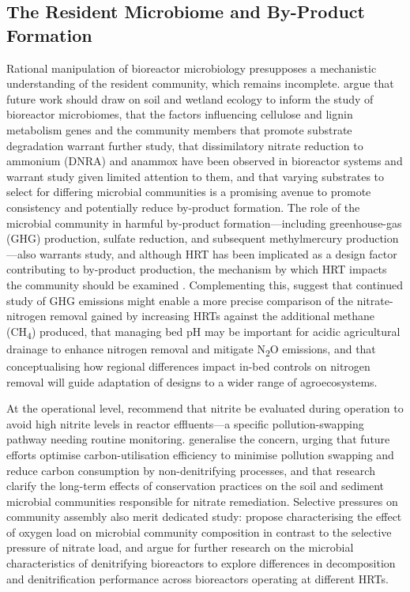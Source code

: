 \documentclass[11pt]{article}
\begin{document}
\subsection{The Resident Microbiome and By-Product Formation}
Rational manipulation of bioreactor microbiology presupposes a mechanistic understanding of the resident community, which remains incomplete. \textcite{Hartfiel2022} argue that future work should draw on soil and wetland ecology to inform the study of bioreactor microbiomes, that the factors influencing cellulose and lignin metabolism genes and the community members that promote substrate degradation warrant further study, that dissimilatory nitrate reduction to ammonium (DNRA) and anammox have been observed in bioreactor systems and warrant study given limited attention to them, and that varying substrates to select for differing microbial communities is a promising avenue to promote consistency and potentially reduce by-product formation. The role of the microbial community in harmful by-product formation---including greenhouse-gas (GHG) production, sulfate reduction, and subsequent methylmercury production---also warrants study, and although HRT has been implicated as a design factor contributing to by-product production, the mechanism by which HRT impacts the community should be examined \parencite{Hartfiel2022}. Complementing this, \textcite{Bock2018} suggest that continued study of GHG emissions might enable a more precise comparison of the nitrate-nitrogen removal gained by increasing HRTs against the additional methane (CH\textsubscript{4}) produced, that managing bed pH may be important for acidic agricultural drainage to enhance nitrogen removal and mitigate N\textsubscript{2}O emissions, and that conceptualising how regional differences impact in-bed controls on nitrogen removal will guide adaptation of designs to a wider range of agroecosystems.

At the operational level, \textcite{Kouanda2021} recommend that nitrite be evaluated during operation to avoid high nitrite levels in reactor effluents---a specific pollution-swapping pathway needing routine monitoring. \textcite{Wang2025b} generalise the concern, urging that future efforts optimise carbon-utilisation efficiency to minimise pollution swapping and reduce carbon consumption by non-denitrifying processes, and that research clarify the long-term effects of conservation practices on the soil and sediment microbial communities responsible for nitrate remediation. Selective pressures on community assembly also merit dedicated study: \textcite{Schaefer2021} propose characterising the effect of oxygen load on microbial community composition in contrast to the selective pressure of nitrate load, and argue for further research on the microbial characteristics of denitrifying bioreactors to explore differences in decomposition and denitrification performance across bioreactors operating at different HRTs.
\end{document}
